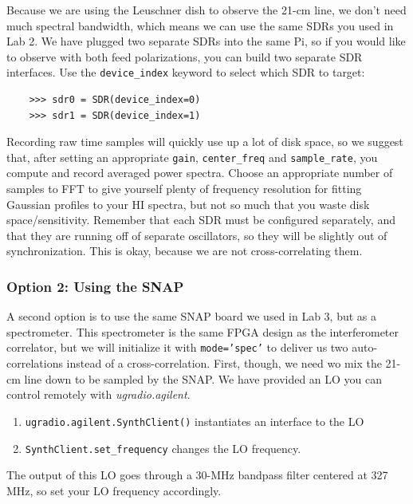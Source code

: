 \documentclass[psfig,preprint]{aastex}
\begin{document}
Because we are using the Leuschner dish to observe the 21-cm line, we don't need much spectral bandwidth,
which means we can use the same SDRs you used in Lab 2. We have plugged two separate SDRs into the same Pi,
so if you would like to observe with both feed polarizations, you can build two separate SDR interfaces.
Use the \texttt{device\_index} keyword to select which SDR to target:
\begin{verbatim}
    >>> sdr0 = SDR(device_index=0)
    >>> sdr1 = SDR(device_index=1)
\end{verbatim}

Recording raw time samples will quickly use up a lot of disk space, so we suggest that,
after setting an appropriate \texttt{gain}, \texttt{center\_freq} and \texttt{sample\_rate}, you compute and record
averaged power spectra. Choose an appropriate number of samples to FFT to give yourself plenty of frequency resolution
for fitting Gaussian profiles to your HI spectra, but not so much that you waste disk space/sensitivity.
Remember that each SDR must be configured separately, and that they are running off of separate
oscillators, so they will be slightly out of synchronization. This is okay, because we are not cross-correlating them.

\subsubsection{Option 2: Using the SNAP}

A second option is to use the same SNAP board we used in Lab 3, but as a spectrometer.
This spectrometer is the same FPGA design as the interferometer correlator, but we will initialize it with
\texttt{mode='spec'} to deliver us two auto-correlations instead of a cross-correlation. First, though, we need
wo mix the 21-cm line down to be sampled by the SNAP. We have provided an LO you can control
remotely with {\it ugradio.agilent}. 
\begin{enumerate}
\item {\tt ugradio.agilent.SynthClient()} instantiates an interface to the LO
\item {\tt SynthClient.set\_frequency} changes the LO frequency.
\end{enumerate}
\noindent
The output of this LO goes through a 30-MHz bandpass filter centered at 327 MHz, so set your LO frequency accordingly.
\end{document}
